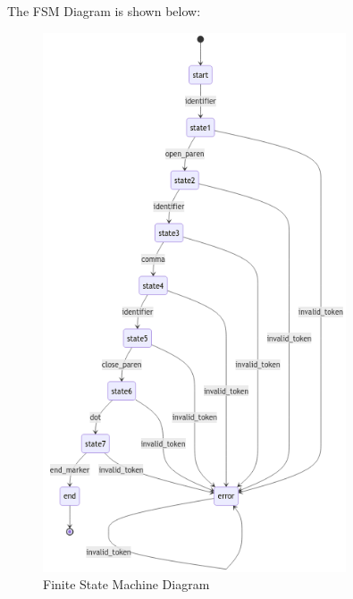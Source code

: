 \documentclass{article}
\begin{document}
The FSM Diagram is shown below:
\begin{figure}[h]
    \centering
    \includegraphics[width=0.8\textwidth]{fsm_diagram.png}
    \caption{Finite State Machine Diagram}
    \label{fig:fsm_diagram}
\end{figure}
\end{document}
